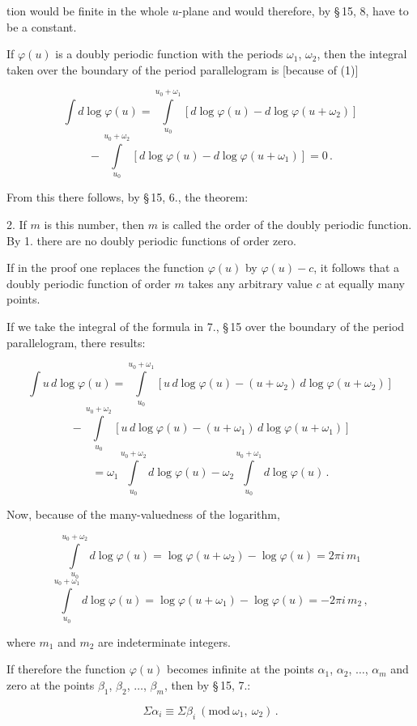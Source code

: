 
tion would be finite in the whole $u$-plane and would therefore, by
§\,15, 8, have to be a constant.

If $\varphi(u)$ is a doubly periodic function with the periods
$\omega_1$, $\omega_2$, then the integral taken over the boundary of the period
 parallelogram is [because of (1)]

\[
\int d\log\varphi(u) = \int\limits_{u_0}^{u_0+\omega_1} [d\log\varphi(u) - d\log\varphi(u+\omega_2)]
\]
\[
{}-\int\limits_{u_0}^{u_0+\omega_2} [d\log\varphi(u) - d\log\varphi(u+\omega_1)] = 0\,.
\]

From this there follows, by §\,15, 6., the theorem:

2.  If $m$ is this number, then $m$ is called the order
of the doubly periodic function. By 1. there are no
doubly periodic functions of order zero.

If in the proof one replaces the function $\varphi(u)$ by $\varphi(u)-c$,
it follows that a doubly periodic function of order $m$
takes any arbitrary value $c$ at equally many points.

If we take the integral of the formula in 7., §\,15 over the boundary
 of the period parallelogram, there results:

\[
\int u\, d\log\varphi(u) = \int\limits_{u_0}^{u_0+\omega_1} [u\,d\log\varphi(u) - (u+\omega_2)\,d\log\varphi(u+\omega_2)]
\]
\[
{}-\int\limits_{u_0}^{u_0+\omega_2} [u\,d\log\varphi(u) - (u+\omega_1)\,d\log\varphi(u+\omega_1)]
\]
\[
{}=\omega_1\int\limits_{u_0}^{u_0+\omega_2} d\log\varphi(u) - \omega_2\int\limits_{u_0}^{u_0+\omega_1} d\log\varphi(u)\,.
\]

Now, because of the many-valuedness of the logarithm,

\[
\int\limits_{u_0}^{u_0+\omega_2} d\log\varphi(u) = \log\varphi(u+\omega_2) - \log\varphi(u) = 2\pi i\, m_1
\]
\[
\int\limits_{u_0}^{u_0+\omega_1} d\log\varphi(u) = \log\varphi(u+\omega_1) - \log\varphi(u) = -2\pi i\, m_2\,,
\]

where $m_1$ and $m_2$ are indeterminate integers.

If therefore the function $\varphi(u)$ becomes infinite at the points $\alpha_1$, $\alpha_2$, $\dots$, $\alpha_m$
and zero at the points $\beta_1$, $\beta_2$, $\dots$, $\beta_m$, then by
§\,15, 7.:

\[ \Sigma\alpha_i \equiv \Sigma\beta_i \ (\mathrm{mod}\ \omega_1,\ \omega_2)\,. \]
